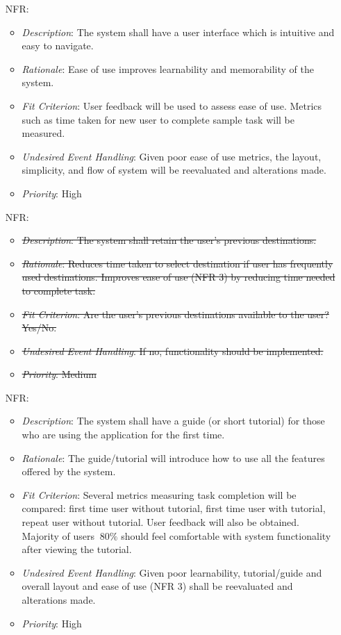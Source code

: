 \documentclass[12pt]{article}
\newcounter{nfrnum} %
\begin{document}
\begin{itemize}
\item[NFR\refstepcounter{nfrnum}\thenfrnum \label{NFR_3}:] 
\begin{itemize}
  \item \textit{Description}: The system shall have a user interface which is intuitive and easy to navigate. 
  \item \textit{Rationale}: Ease of use improves learnability and memorability of the system.
  \item \textit{Fit Criterion}: User feedback will be used to assess ease of use. Metrics such as time taken for new user to complete sample task will be measured.
  \item \textit{Undesired Event Handling}: Given poor ease of use metrics, the layout, simplicity, and flow of system will be reevaluated and alterations made. 
  \item \textit{Priority}: High
\end{itemize}

\item[NFR\refstepcounter{nfrnum}\thenfrnum \label{NFR_4}:] 
\begin{itemize}
  \item \sout{\textit{Description}: The system shall retain the user’s previous destinations.}
  \item \sout{\textit{Rationale}: Reduces time taken to select destination if user has frequently used destinations. Improves ease of use (NFR 3) by reducing time needed to complete task.}
  \item \sout{\textit{Fit Criterion}: Are the user’s previous destinations available to the user? Yes/No.}
  \item \sout{\textit{Undesired Event Handling}: If no, functionality should be implemented.}
  \item \sout{\textit{Priority}: Medium}
\end{itemize}

\item[NFR\refstepcounter{nfrnum}\thenfrnum \label{NFR_5}:] 
\begin{itemize}
  \item \textit{Description}: The system shall have a guide (or short tutorial) for those who are using the application for the first time. 
  \item \textit{Rationale}: The guide/tutorial will introduce how to use all the features offered by the system.
  \item \textit{Fit Criterion}: Several metrics measuring task completion will be compared: first time user without tutorial, first time user with tutorial, repeat user without tutorial. User feedback will also be obtained. Majority of users \(\>80\%\) should feel comfortable with system functionality after viewing the tutorial.  
  \item \textit{Undesired Event Handling}: Given poor learnability, tutorial/guide and overall layout and ease of use (NFR 3) shall be reevaluated and alterations made.
  \item \textit{Priority}: High
\end{itemize}


\end{itemize}
\end{document}
